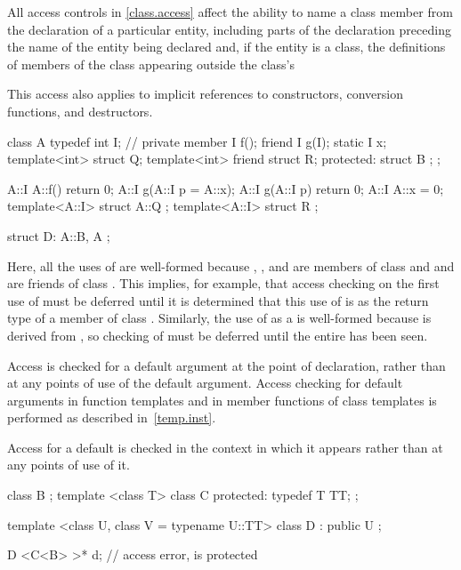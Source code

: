 \pnum
All access controls in \ref{class.access} affect the ability to name a class member
from the declaration of a particular
entity, including parts of the declaration preceding the name of the entity
being declared and, if the entity is a class, the definitions of members of
the class appearing outside the class's 
\begin{note}
This access also applies to implicit references to constructors,
conversion functions, and destructors.
\end{note}

\pnum
\begin{example}
\begin{codeblock}
class A {
  typedef int I;    // private member
  I f();
  friend I g(I);
  static I x;
  template<int> struct Q;
  template<int> friend struct R;
protected:
    struct B { };
};

A::I A::f() { return 0; }
A::I g(A::I p = A::x);
A::I g(A::I p) { return 0; }
A::I A::x = 0;
template<A::I> struct A::Q { };
template<A::I> struct R { };

struct D: A::B, A { };
\end{codeblock}

Here, all the uses of
are well-formed because
,
, and 
are members of class
and
and  are friends of class
.
This implies, for example, that access checking on the first use of
must be deferred until it is determined that this use of
is as the return type of a member of class
.
Similarly, the use of  as a
 is well-formed because 
is derived from , so checking of 
must be deferred until the entire  has been seen.
\end{example}

\pnum
{}%
%
Access is checked for a default argument
at the point of declaration,
rather than at any points of use of the default argument.
Access checking for default arguments in function templates and in
member functions of class templates is performed as described in~\ref{temp.inst}.

\pnum
Access for a default 
is checked in the context in which it appears rather than at any
points of use of it.
\begin{example}
\begin{codeblock}
class B { };
template <class T> class C {
protected:
  typedef T TT;
};

template <class U, class V = typename U::TT>
class D : public U { };

D <C<B> >* d;       // access error,  is protected
\end{codeblock}
\end{example}

